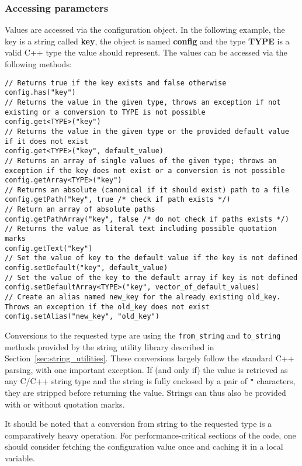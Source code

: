 \subsubsection{Accessing parameters}
\label{sec:accessing_parameters}
Values are accessed via the configuration object.
In the following example, the key is a string called \textbf{key}, the object is named \textbf{config} and the type \textbf{TYPE} is a valid C++ type the value should represent.
The values can be accessed via the following methods:
\begin{verbatim}
// Returns true if the key exists and false otherwise
config.has("key")
// Returns the value in the given type, throws an exception if not existing or a conversion to TYPE is not possible
config.get<TYPE>("key")
// Returns the value in the given type or the provided default value if it does not exist
config.get<TYPE>("key", default_value)
// Returns an array of single values of the given type; throws an exception if the key does not exist or a conversion is not possible
config.getArray<TYPE>("key")
// Returns an absolute (canonical if it should exist) path to a file
config.getPath("key", true /* check if path exists */)
// Return an array of absolute paths
config.getPathArray("key", false /* do not check if paths exists */)
// Returns the value as literal text including possible quotation marks
config.getText("key")
// Set the value of key to the default value if the key is not defined
config.setDefault("key", default_value)
// Set the value of the key to the default array if key is not defined
config.setDefaultArray<TYPE>("key", vector_of_default_values)
// Create an alias named new_key for the already existing old_key. Throws an exception if the old_key does not exist
config.setAlias("new_key", "old_key")
\end{verbatim}

Conversions to the requested type are using the \texttt{from\_string} and \texttt{to\_string} methods provided by the string utility library described in Section~\ref{sec:string_utilities}.
These conversions largely follow the standard C++ parsing, with one important exception.
If (and only if) the value is retrieved as any C/C++ string type and the string is fully enclosed by a pair of \texttt{"} characters, they are stripped before returning the value.
Strings can thus also be provided with or without quotation marks.

\begin{warning}
    It should be noted that a conversion from string to the requested type is a comparatively heavy operation.
    For performance-critical sections of the code, one should consider fetching the configuration value once and caching it in a local variable.
\end{warning}

